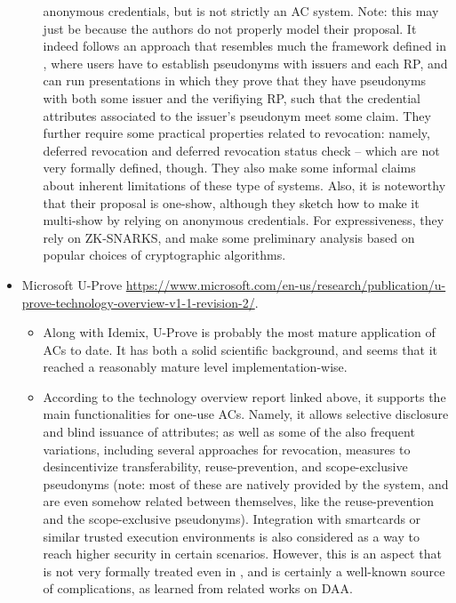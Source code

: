 \begin{itemize}
\begin{itemize}
    anonymous credentials, but is not strictly an AC system. Note: this may just
    be because the authors do not properly model their proposal. It indeed
    follows an approach that resembles much the framework defined in \cite{cl01},
    where users have to establish pseudonyms with issuers and each RP, and can
    run presentations in which they prove that they have pseudonyms with both
    some issuer and the verifiying RP, such that the credential attributes
    associated to the issuer's pseudonym meet some claim. They further require
    some practical properties related to revocation: namely, deferred revocation
    and deferred revocation status check -- which are not very formally defined,
    though. They also make some informal claims about inherent limitations of
    these type of systems. Also, it is noteworthy that their proposal is one-show,
    although they sketch how to make it multi-show by relying on anonymous
    credentials. For expressiveness, they rely on ZK-SNARKS, and make some
    preliminary analysis based on popular choices of cryptographic algorithms.
  \end{itemize}
\item Microsoft U-Prove \url{https://www.microsoft.com/en-us/research/publication/u-prove-technology-overview-v1-1-revision-2/}.
  \begin{itemize}
  \item Along with Idemix, U-Prove is probably the most mature application of
    ACs to date. It has both a solid scientific background, and seems that it
    reached a reasonably mature level implementation-wise.
  \item According to the technology overview report linked above, it supports
    the main functionalities for one-use ACs. Namely, it allows selective
    disclosure and blind issuance of attributes; as well as some of the also
    frequent variations, including several approaches for revocation, measures
    to desincentivize transferability, reuse-prevention, and scope-exclusive
    pseudonyms (note: most of these are natively provided by the system, and
    are even somehow related between themselves, like the reuse-prevention and
    the scope-exclusive pseudonyms). Integration with smartcards or similar
    trusted execution environments is also considered as a way to reach higher
    security in certain scenarios. However, this is an aspect that is not very
    formally treated even in \cite{bran00}, and is certainly a well-known source
    of complications, as learned from related works on DAA.
  \end{itemize}
\end{itemize}


